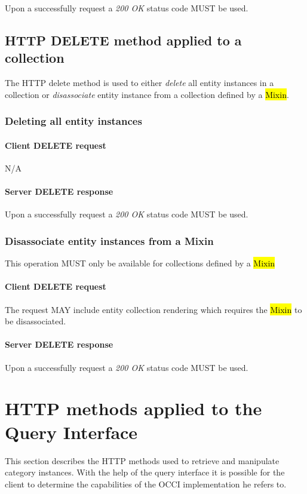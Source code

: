 \documentclass[10pt,a4paper]{article}
\begin{document}
Upon a successfully request a \emph{200 OK} status code MUST be used.

\subsection{HTTP DELETE method applied to a collection}
The HTTP delete method is used to either {\em delete} all entity instances in a collection or {\em disassociate} entity instance from a collection defined by a \hl{Mixin}.

\subsubsection{Deleting all entity instances}

\paragraph{Client DELETE request}
N/A

\paragraph{Server DELETE response}
Upon a successfully request a \emph{200 OK} status code MUST be used.

\subsubsection{Disassociate entity instances from a Mixin}
This operation MUST only be available for collections defined by a \hl{Mixin}

\paragraph{Client DELETE request}
The request MAY include entity collection rendering which requires the \hl{Mixin} to be disassociated.

\paragraph{Server DELETE response}
Upon a successfully request a \emph{200 OK} status code MUST be used.

\section{HTTP methods applied to the Query Interface}
This section describes the HTTP methods used to retrieve and manipulate category instances.  With the help of the query interface it is possible for the client to determine the capabilities of the OCCI implementation he refers to.
\end{document}
